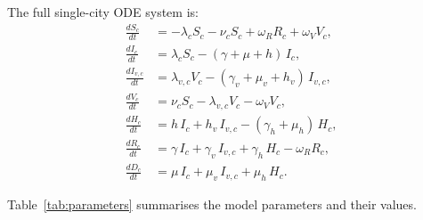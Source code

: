 The full single-city ODE system is:
\begin{align}
  \frac{dS_c}{dt}   &= -\lambda_c S_c - \nu_c S_c + \omega_R R_c + \omega_V V_c, \label{eq:dS} \\
  \frac{dI_c}{dt}   &= \lambda_c S_c - (\gamma + \mu + h)\,I_c, \label{eq:dI} \\
  \frac{dI_{v,c}}{dt} &= \lambda_{v,c} V_c - (\gamma_v + \mu_v + h_v)\,I_{v,c}, \label{eq:dIv} \\
  \frac{dV_c}{dt}   &= \nu_c S_c - \lambda_{v,c} V_c - \omega_V V_c, \label{eq:dV} \\
  \frac{dH_c}{dt}   &= h\,I_c + h_v\,I_{v,c} - (\gamma_h + \mu_h)\,H_c, \label{eq:dH} \\
  \frac{dR_c}{dt}   &= \gamma\,I_c + \gamma_v\,I_{v,c} + \gamma_h\,H_c - \omega_R R_c, \label{eq:dR} \\
  \frac{dD_c}{dt}   &= \mu\,I_c + \mu_v\,I_{v,c} + \mu_h\,H_c. \label{eq:dD}
\end{align}

Table~\ref{tab:parameters} summarises the model parameters and their values.

